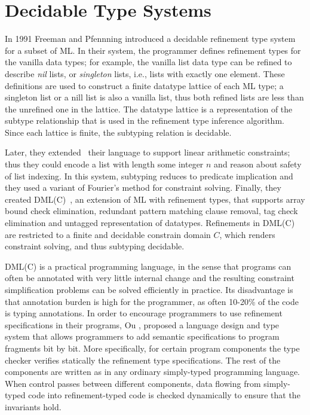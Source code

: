 \newcommand\qset{\ensuremath{\mathbb{Q}}\xspace}
\newcommand\NV[1]{\columnbreak}


\section{Decidable Type Systems}\label{sec:liquid}
In 1991 Freeman and Pfennning \cite{FreemanPfenning91} introduced
a decidable refinement type system for a subset of ML.
%
In their system, the programmer defines refinement
types for the vanilla data types; 
for example, the vanilla 
list data type can be refined to 
describe \textit{nil} lists, or \textit{singleton} lists, i.e., lists
with exactly one element.
%
These definitions are used to 
construct a finite datatype lattice of each ML type;
a singleton list or a nill list is
also a vanilla list, thus both refined lists are 
less than the unrefined one in the lattice.
%
The datatype lattice is a representation of the subtype
relationship that is used in the 
refinement type inference algorithm. 
Since each lattice is finite, the 
subtyping relation is decidable.

Later, 
they extended~\cite{pfenningxi98} their language to support
linear arithmetic constraints; thus they could
encode a list with length some integer $n$ and 
reason about safety of list indexing.
In this system, subtyping reduces to predicate implication
and they used a variant of Fourier's method \cite{OmegaTestCACM} 
for constraint solving.
%
Finally, they created DML(C)~\cite{XiPfenning99}, 
an extension of ML with refinement types, that supports 
array bound check elimination,
redundant pattern matching clause removal, 
tag check elimination and untagged representation of datatypes.
%
Refinements in DML(C) are restricted to a finite and decidable
constrain domain $C$, 
which renders constraint solving, and thus subtyping decidable.
%

DML(C)  is a practical programming language, in the sense that 
programs can often be annotated with
very little internal change and the resulting
constraint simplification problems can be solved efficiently
in practice. 
%
Its disadvantage is that annotation burden is high for the programmer,  
as often 10-20\% of
the code is typing annotations.
%
In order to encourage programmers to use refinement specifications in their programs,
Ou \etal \cite{Ou2004}, proposed a language design and type system that allows programmers to add
semantic specifications to program fragments bit by bit. 
More specifically, for certain program components the type checker verifies
statically the refinement type specifications.
%
The rest of the components are written as in any ordinary simply-typed programming language. 
When control passes between different components, data flowing
from simply-typed code into refinement-typed code is checked dynamically 
to ensure that the invariants hold.
%

